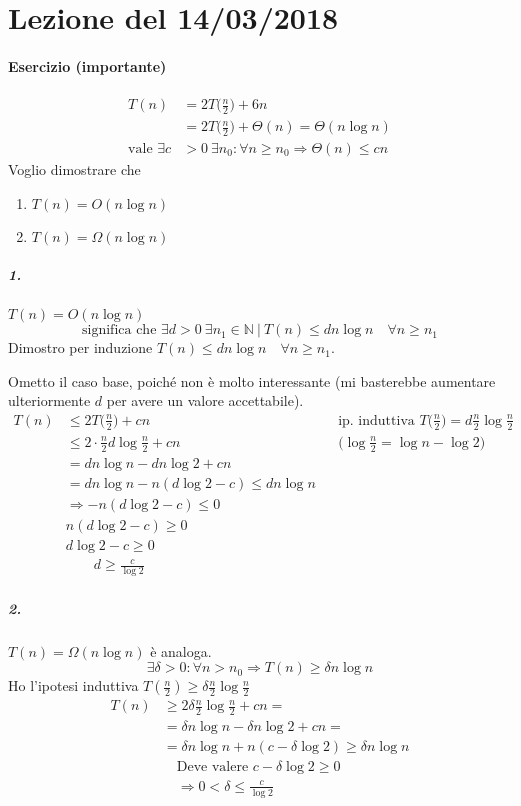 \section{Lezione del 14/03/2018}
\paragraph{Esercizio (importante)} 
\begin{align*}
	T(n) & = 2T\Big(\frac{n}{2}\Big) + 6n \\
		& = 2T\Big(\frac{n}{2}\Big) + \Theta (n) = \Theta (n \log n) \\
		\text{vale } \exists c & > 0 \ \exists n_0 : \forall n \geq n_0 \Rightarrow \Theta(n) \leq cn
\end{align*}
Voglio dimostrare che 
\begin{enumerate}
	\item $T(n) = O(n \log n)$
	\item $T(n) = \Omega (n \log n)$
\end{enumerate}

\subparagraph{1.} $T(n) = O(n \log n)$
\begin{displaymath}
	\text{significa che } \exists d > 0 \ \exists n_1 \in \mathbb{N} \ \vert \ T(n) \leq dn \log n \quad \forall n \geq n_1
\end{displaymath}
Dimostro per induzione $T(n) \leq dn \log n \quad \forall n \geq n_1$.\par
Ometto il caso base, poiché non è molto interessante (mi basterebbe aumentare ulteriormente $d$ per avere
un valore accettabile).
\begin{align*}
	T(n) & \leq 2T\Big(\frac{n}{2}\Big) + cn && \text{ip. induttiva } T\Big(\frac{n}{2}\Big) = d \frac{n}{2} \log \frac{n}{2} \\
	& \leq 2 \cdot \frac{n}{2} d \log \frac{n}{2} + cn && \Big(\log \frac{n}{2} = \log n - \log 2\Big) \\
	& = dn \log n - dn \log 2 + cn \\
	& = dn \log n - n(d \log 2 - c) \leq dn \log n \\
	& \Rightarrow - n(d \log 2 - c) \leq 0 \\
	& n(d \log 2 - c) \geq 0 \\
	& d \log 2 - c \geq 0 \\
	& \qquad d \geq \frac{c}{\log 2}
\end{align*}

\subparagraph{2.} $T(n) = \Omega (n \log n)$ è analoga.
\[
	\exists \delta > 0 : \forall n > n_0 \Rightarrow T(n) \geq \delta n \log n
\]
Ho l'ipotesi induttiva $T(\frac{n}{2}) \geq \delta \frac{n}{2} \log \frac{n}{2}$
\begin{align*}
	T(n) & \geq 2\delta \frac{n}{2} \log \frac{n}{2} + cn = \\
	& = \delta n \log n - \delta n \log 2 + cn = \\
	& = \delta n \log n + n(c - \delta \log 2) \geq \delta n \log n \\
	& \quad \text{Deve valere } c - \delta \log 2 \geq 0 \\
	& \quad \Rightarrow 0 < \delta \leq \frac{c}{\log 2}
\end{align*}
